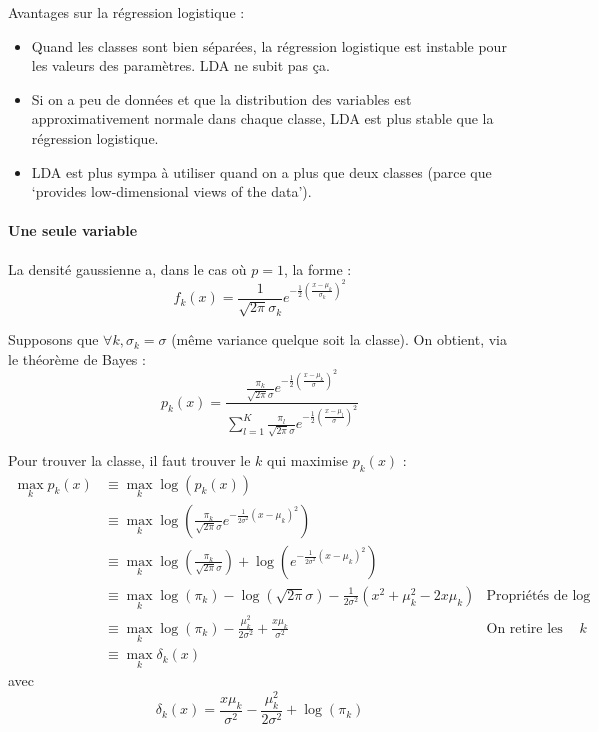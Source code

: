         Avantages sur la régression logistique :
        \begin{itemize}
            \item Quand les classes sont bien séparées, la régression logistique est instable pour les valeurs des paramètres. LDA ne subit pas ça.
            \item Si on a peu de données et que la distribution des variables est approximativement normale dans chaque classe, LDA est plus stable que la régression logistique.
            \item LDA est plus sympa à utiliser quand on a plus que deux classes (parce que `provides low-dimensional views of the data').
        \end{itemize}

        \paragraph{Une seule variable}
            La densité gaussienne a, dans le cas où \(p = 1\), la forme :
            \[
                f_k(x) = \frac{1}{\sqrt{2\pi}\sigma_k} e^{-\frac{1}{2}\left(\frac{x - \mu_k}{\sigma_k}\right)^2}
            \]
            
            Supposons que \(\forall k, \sigma_k = \sigma\) (même variance quelque soit la classe). On obtient, via le théorème de Bayes :
            \[
                p_k(x) = \frac{\frac{\pi_k}{\sqrt{2\pi}\sigma} e^{-\frac{1}{2}\left(\frac{x - \mu_k}{\sigma}\right)^2}}{\sum_{l=1}^K \frac{\pi_l}{\sqrt{2\pi}\sigma} e^{-\frac{1}{2}\left(\frac{x - \mu_l}{\sigma}\right)^2}}
            \]

            Pour trouver la classe, il faut trouver le \(k\) qui maximise \(p_k(x)\) :
            \begin{align*}
                \max_k p_k(x) &\equiv \max_k \log(p_k(x))\\
                &\equiv \max_k \log\left(\frac{\pi_k}{\sqrt{2\pi}\sigma} e^{-\frac{1}{2\sigma^2}(x - \mu_k)^2}\right)\\
                &\equiv \max_k \log\left(\frac{\pi_k}{\sqrt{2\pi}\sigma}\right) + \log\left(e^{-\frac{1}{2\sigma^2} (x - \mu_k)^2}\right)\\
                &\equiv \max_k \log(\pi_k) - \log(\sqrt{2\pi}\sigma) - \frac{1}{2\sigma^2} (x^2 + \mu_k^2 - 2x\mu_k) & \text{Propriétés de \(\log\)}\\
                &\equiv \max_k \log(\pi_k) - \frac{\mu_k^2}{2\sigma^2} + \frac{x \mu_k}{\sigma^2} & \text{On retire les termes indépendants de \(k\)}\\
                &\equiv \max_k \delta_k(x)
            \end{align*}
            avec \[\delta_k(x) = \frac{x \mu_k}{\sigma^2} - \frac{\mu_k^2}{2\sigma^2} + \log(\pi_k)\]

